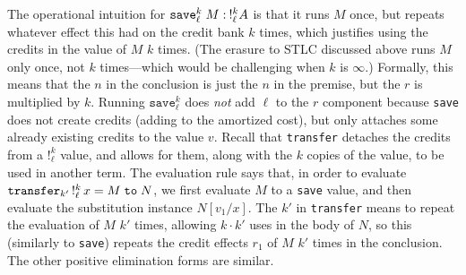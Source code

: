 
The operational intuition for $\texttt{save}^{k}_{\ell} \; M : \: !^k_\ell A$ is that
it runs $M$ once, but repeats whatever effect this had on the credit
bank $k$ times, which justifies using the credits in the value of $M$
$k$ times.  (The erasure to STLC discussed above runs $M$ only once, not
$k$ times---which would be challenging when $k$ is $\infty$.)  Formally,
this means that the $n$ in the conclusion is just the $n$ in the
premise, but the $r$ is multiplied by $k$.  Running
$\texttt{save}^k_\ell$ does \textit{not} add $\ell$ to the $r$ component
because \texttt{save} does not create credits (adding to the amortized
cost), but only attaches some already existing credits to the value $v$.
Recall that \texttt{transfer} detaches the credits from a $!^k_\ell$
value, and allows for them, along with the $k$ copies of the value, to
be used in another term. The evaluation rule says that, in order to
evaluate $\texttt{transfer}_{k'} \, !^{k}_{\ell} \, x = M \; \texttt{to} \; N$, we first evaluate $M$ to a
\texttt{save} value, and then evaluate the substitution instance
$N[v_1/x]$. The $k'$ in \texttt{transfer} means to repeat the evaluation
of $M$ $k'$ times, allowing $k \cdot k'$ uses in the body of $N$, so
this (similarly to \texttt{save}) repeats the credit effects $r_1$ of
$M$ $k'$ times in the conclusion.  The other positive elimination forms are similar.  
  

